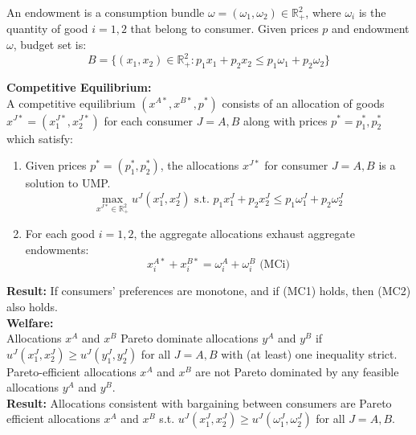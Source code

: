 \documentclass[12pt]{article}
\newcommand{\R}{\mathbb{R}^2_+}
\newcommand{\opxa}{x^{A\ast}}
\newcommand{\opxb}{x^{B\ast}}
\newcommand{\opp}{p^{\ast}}
\newcommand{\oppo}{p^{\ast}_1}
\newcommand{\oppt}{p^{\ast}_2}
\begin{document}
\noindent
An endowment is a consumption bundle $\omega = (\omega_1,\omega_2) \in \R$, where $\omega_i$ is the quantity of good $i = 1,2$ that belong to consumer. Given prices $p$ and endowment $\omega$, budget set is: 
\[ B = \{ (x_1, x_2) \in \R: p_1x_1 + p_2x_2 \leq p_1\omega_1 + p_2\omega_2  \}
\]

\noindent
\textbf{Competitive Equilibrium:}\\

\noindent
A competitive equilibrium $(\opxa, \opxb, p^{\ast})$ consists of an allocation of goods $x^{J\ast} = (x^{J\ast}_1, x^{J\ast}_2)$ for each consumer $J = A, B$ along with prices $\opp = \oppo, \oppt$ which satisfy: 
\begin{enumerate}
	\item Given prices $\opp = (\oppo, \oppt)$, the allocations $x^{J\ast}$ for consumer $J= A, B$ is a solution to UMP. \\
	\[ \max_{x^{J\ast} \in \R} u^{J}(x^{J}_1, x^{J}_2) \text{ s.t. } p_1x^{J}_1 + p_2x^{J}_2 \leq p_1\omega^{J}_1 + p_2\omega^{J}_2
	\]
	\item For each good $i=1,2$, the aggregate allocations exhaust aggregate endowments:
	\[ x^{A\ast}_i + x^{B\ast}_i = \omega^{A}_i + \omega^{B}_i \text{ (MCi)}
	\]
\end{enumerate}
\noindent
\textbf{Result:} If consumers' preferences are monotone, and if (MC1) holds, then (MC2) also holds. \\


\noindent
\textbf{Welfare:}\\

\noindent
Allocations $x^{A}$ and $x^{B}$ Pareto dominate allocations $y^{A}$ and $y^{B}$ if $u^{J}(x^J_1, x^J_2) \geq u^J(y^J_1, y^J_2) $ for all $J = A, B$ with (at least) one inequality strict. \\
Pareto-efficient allocations $x^A$ and $x^B$ are not Pareto dominated by any feasible allocations $y^A$ and $y^B$. \\
\textbf{Result:} Allocations consistent with bargaining between consumers are Pareto efficient allocations $x^A$ and $x^B$ s.t. $u^J(x^J_1, x^J_2) \geq u^J(\omega^J_1, \omega^J_2)$ for all $J =A, B$.\\
\end{document}
